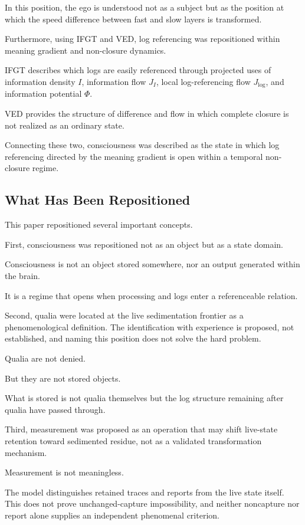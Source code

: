 In this position, the ego is understood not as a subject but as the position at which the speed difference between fast and slow layers is transformed.

Furthermore, using IFGT and VED, log referencing was repositioned within meaning gradient and non-closure dynamics.

IFGT describes which logs are easily referenced through projected uses of information density $I$, information flow $J_I$, local log-referencing flow $J_{\log}$, and information potential $\Phi$.

VED provides the structure of difference and flow in which complete closure is not realized as an ordinary state.

Connecting these two, consciousness was described as the state in which log referencing directed by the meaning gradient is open within a temporal non-closure regime.

\subsection{What Has Been Repositioned}


This paper repositioned several important concepts.

First, consciousness was repositioned not as an object but as a state domain.

Consciousness is not an object stored somewhere, nor an output generated within the brain.

It is a regime that opens when processing and logs enter a referenceable relation.

Second, qualia were located at the live sedimentation frontier as a phenomenological definition. The identification with experience is proposed, not established, and naming this position does not solve the hard problem.

Qualia are not denied.

But they are not stored objects.

What is stored is not qualia themselves but the log structure remaining after qualia have passed through.

Third, measurement was proposed as an operation that may shift live-state retention toward sedimented residue, not as a validated transformation mechanism.

Measurement is not meaningless.

The model distinguishes retained traces and reports from the live state itself. This does not prove unchanged-capture impossibility, and neither noncapture nor report alone supplies an independent phenomenal criterion.

